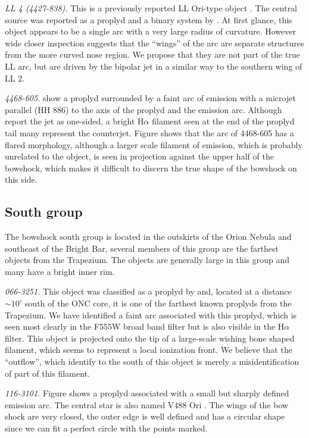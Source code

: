 \documentclass{article}
\newcommand\ha{\ensuremath{\mathrm{H}\alpha}}
\begin{document}
\textit{LL 4 (4427-838).} This is a previously reported LL Ori-type object \citep{Bally:2001}. The central source was reported as a proplyd and a binary system by \citet{Bally:2006a}. At first glance, this object appears to be a single arc with a very large radius of curvature. However wide closer inspection suggests that the ``wings'' of the arc are separate structures from the more curved nose region. We propose that they are not part of the true LL arc, but are driven by the bipolar jet \citep{Bally:2006a} in a similar way to the southern wing of LL 2.     

\textit{4468-605.}  \citet{Bally:2006a} show a proplyd  surrounded by a faint arc of emission with a  microjet parallel (HH 886) to the axis of the proplyd and the emission arc. Although \citet{Bally:2006a} report the jet as one-sided, a bright \ha{} filament seen at the end of the proplyd tail many represent the counterjet.  Figure shows that the arc of 4468-605 has a flared morphology, although a larger scale filament of emission, which is probably unrelated to the object, is seen in projection against the upper half of the bowshock, which makes it difficult to discern the true shape of the bowshock on this side. 

\subsection{South group}
\label{sec:S}

The bowshock south group is located in the outskirts of the Orion Nebula and southeast of the Bright Bar, several members of this group are the farthest objects from the Trapezium. The objects are generally large in this group and many have a bright inner rim.   

\textit{066-3251.} This object was classified as a proplyd by \citet{Ricci:2008} and, located at a distance \(\sim 10'\) south of the ONC core, it is one of the farthest known proplyds from the Trapezium. We have identified a faint arc associated with this proplyd, which is seen most clearly in the F555W broad band filter but is also visible in the \ha{} filter. This object is projected onto the tip of a large-scale wishing bone shaped filament, which seems to represent a local ionization front. We believe that the ``outflow'', which \citet{Ricci:2008} identify to the south of this object is merely a misidentification of part of this filament.  

\textit{116-3101.} Figure shows a proplyd associated with a small but sharply defined emission arc.  The central star is also named V488 Ori \citep{Bally:2006a}. The wings of the bow shock are very closed, the outer edge is well defined and has a circular shape since we can fit a perfect circle with the points marked.  
\end{document}
